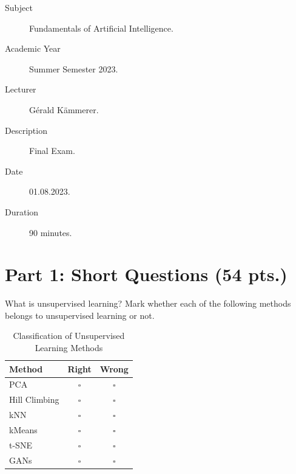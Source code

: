 \documentclass[12pt]{article}
\begin{document}
    

    \begin{description}
        \item[Subject] Fundamentals of Artificial Intelligence.
        \item[Academic Year] Summer Semester 2023.
        \item[Lecturer] Gérald Kämmerer.
        \item[Description] Final Exam.
        \item[Date] 01.08.2023.
        \item[Duration] 90 minutes.
    \end{description}
    \newpage


    \section*{Part 1: Short Questions (54 pts.)}

    \begin{ejercicio}
        What is unsupervised learning? Mark whether each of the following methods belongs to unsupervised learning or not.

        \begin{table}[h!]
        \centering
        \begin{tabular}{lcc}
        \hline
        \textbf{Method} & \textbf{Right} & \textbf{Wrong} \\ \hline
        PCA & $\square$ & $\square$ \\
        Hill Climbing & $\square$ & $\square$ \\
        kNN & $\square$ & $\square$ \\
        kMeans & $\square$ & $\square$ \\
        t-SNE & $\square$ & $\square$ \\
        GANs & $\square$ & $\square$ \\ \hline
        \end{tabular}
        \caption{Classification of Unsupervised Learning Methods}
        \label{tab:unsupervised_methods}
        \end{table}
    \end{ejercicio}
\end{document}
